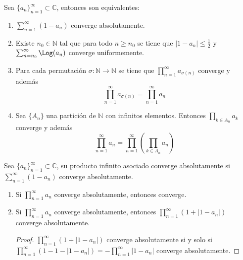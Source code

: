 \begin{theorem}
    Sea $\{a_n\}_{n=1}^\infty \subset \mathbb{C}$, entonces son equivalentes:
    \begin{enumerate}
        \item $\sum_{n=1}^\infty (1-a_n)$ converge absolutamente.
        \item Existe $n_0 \in \mathbb{N}$ tal que para todo $n \geq n_0$ se tiene que $|1-a_n| \leq \frac{1}{2}$ y $\sum_{n=n_0}^\infty \Log(a_n)$ converge uniformemente.
        \item Para cada permutación $\sigma: \mathbb{N} \to \mathbb{N}$ se tiene que $\prod_{n=1}^\infty a_{\sigma(n)}$ converge y además
              $$\prod_{n=1}^\infty a_{\sigma(n)} = \prod_{n=1}^\infty a_n$$
        \item Sea $\{A_n\}$ una partición de $\mathbb{N}$ con infinitos elementos.
              Entonces $\prod_{k \in A_n} a_k$ converge y además
              $$\prod_{n=1}^\infty a_n = \prod_{n=1}^\infty \left(\prod_{k \in A_n} a_n\right)$$
    \end{enumerate}
\end{theorem}

\begin{definition}
    Sea $\{a_n\}_{n=1}^\infty \subset \mathbb{C}$, su producto infinito asociado converge absolutamente si $\sum_{n=1}^\infty (1-a_n)$ converge absolutamente.
\end{definition}

\begin{remark}
    \hfill
    \begin{enumerate}
        \item Si $\prod_{n=1}^\infty a_n$ converge absolutamente, entonces converge.
        \item Si $\prod_{n=1}^\infty a_n$ converge absolutamente, entonces $\prod_{n=1}^\infty \left(1 + |1-a_n|\right)$ converge absolutamente.
              \begin{proof}
                  $\prod_{n=1}^\infty \left(1 + |1-a_n|\right)$ converge absolutamente si y solo si $\prod_{n=1}^\infty \left(1 - 1 - |1-a_n|\right) = -\prod_{n=1}^\infty |1-a_n|$ converge absolutamente.
              \end{proof}
    \end{enumerate}
\end{remark}

